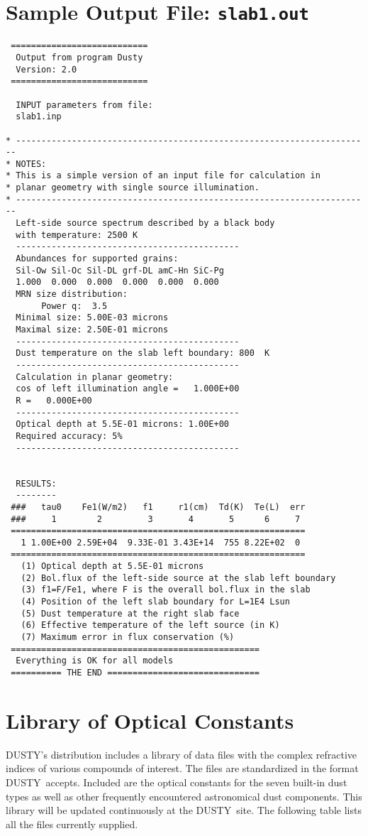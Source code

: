\documentclass[12pt]{article} \usepackage{epsf}
\def\Section#1{\section{\sc #1}}
\def\D  {{\sf DUSTY}}
\begin{document}
\Section{Sample Output File: \tt slab1.out} \label{slab1}
\begin{verbatim}
 ===========================
  Output from program Dusty
  Version: 2.0
 ===========================

  INPUT parameters from file:
  slab1.inp

* ----------------------------------------------------------------------
* NOTES:
* This is a simple version of an input file for calculation in
* planar geometry with single source illumination.
* ----------------------------------------------------------------------
  Left-side source spectrum described by a black body
  with temperature: 2500 K
  --------------------------------------------
  Abundances for supported grains:
  Sil-Ow Sil-Oc Sil-DL grf-DL amC-Hn SiC-Pg
  1.000  0.000  0.000  0.000  0.000  0.000
  MRN size distribution:
       Power q:  3.5
  Minimal size: 5.00E-03 microns
  Maximal size: 2.50E-01 microns
  --------------------------------------------
  Dust temperature on the slab left boundary: 800  K
  --------------------------------------------
  Calculation in planar geometry:
  cos of left illumination angle =   1.000E+00
  R =   0.000E+00
  --------------------------------------------
  Optical depth at 5.5E-01 microns: 1.00E+00
  Required accuracy: 5%
  --------------------------------------------


  RESULTS:
  --------
 ###   tau0    Fe1(W/m2)   f1     r1(cm)  Td(K)  Te(L)  err
 ###     1        2         3       4       5      6     7
 ==========================================================
   1 1.00E+00 2.59E+04  9.33E-01 3.43E+14  755 8.22E+02  0
 ==========================================================
   (1) Optical depth at 5.5E-01 microns
   (2) Bol.flux of the left-side source at the slab left boundary
   (3) f1=F/Fe1, where F is the overall bol.flux in the slab
   (4) Position of the left slab boundary for L=1E4 Lsun
   (5) Dust temperature at the right slab face
   (6) Effective temperature of the left source (in K)
   (7) Maximum error in flux conservation (%)
 =================================================
  Everything is OK for all models
 ========== THE END ==============================
\end{verbatim}

\newpage
\Section{Library of Optical Constants} \label{nklib}

\D's distribution includes a library of data files with the complex refractive
indices of various compounds of interest.  The files are standardized in the
format \D\ accepts. Included are the optical constants for the seven built-in
dust types as well as other frequently encountered astronomical dust
components.  This library will be updated continuously at the \D\ site. The
following table lists all the files currently supplied.
\end{document}

